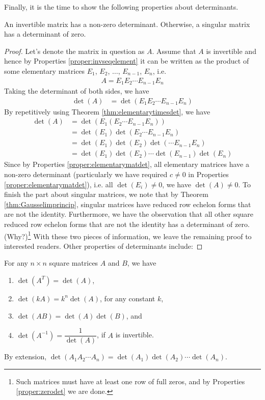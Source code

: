 Finally, it is the time to show the following properties about determinants.
\begin{proper}
\label{proper:invnonzerodet}
An invertible matrix has a non-zero determinant. Otherwise, a singular matrix has a determinant of zero.
\end{proper}
\begin{proof}
Let's denote the matrix in question as $A$. Assume that $A$ is invertible and hence by Properties \ref{proper:invseqelement} it can be written as the product of some elementary matrices $E_1$, $E_2$, $\ldots$, $E_{n-1}$, $E_n$, i.e.\
\begin{align*}
A = E_{1}E_{2} \cdots E_{n-1}E_n
\end{align*}
Taking the determinant of both sides, we have
\begin{align*}
\det(A) &= \det(E_{1}E_{2} \cdots E_{n-1}E_n)
\end{align*}
By repetitively using Theorem \ref{thm:elementarytimesdet}, we have
\begin{align*}
\det(A) &= \det(E_{1}(E_{2} \cdots E_{n-1}E_n)) \\
&= \det(E_1) \det(E_{2} \cdots E_{n-1}E_n) \\
&= \det(E_1) \det(E_{2}) \det(\cdots E_{n-1}E_n) \\
&= \det(E_1) \det(E_{2}) \cdots \det(E_{n-1})\det(E_n)
\end{align*}
Since by Properties \ref{proper:elementarymatdet}, all elementary matrices have a non-zero determinant (particularly we have required $c \neq 0$ in Properties \ref{proper:elementarymatdet}), i.e. all $\det(E_i) \neq 0$, we have $\det(A) \neq 0$. To finish the part about singular matrices, we note that by Theorem \ref{thm:Gausselimprincip}, singular matrices have reduced row echelon forms that are not the identity. Furthermore, we have the observation that all other square reduced row echelon forms that are not the identity has a determinant of zero. (Why?)\footnote{Such matrices must have at least one row of full zeros, and by Properties \ref{proper:zerodet} we are done.} With these two pieces of information, we leave the remaining proof to interested readers. Other properties of determinants include:
\end{proof}
\begin{proper}
\label{proper:properdet}
For any $n \times n$ square matrices $A$ and $B$, we have
\begin{enumerate}
\item $\det(A^T) = \det(A)$,
\item $\det(kA) = k^n \det(A)$, for any constant $k$,
\item $\det(AB) = \det(A)\det(B)$, and
\item $\det(A^{-1}) = \dfrac{1}{\det(A)}$, if $A$ is invertible.
\end{enumerate}
By extension, $\det(A_1A_2\cdots A_n) = \det(A_1)\det(A_2)\cdots\det(A_n)$.
\end{proper}
